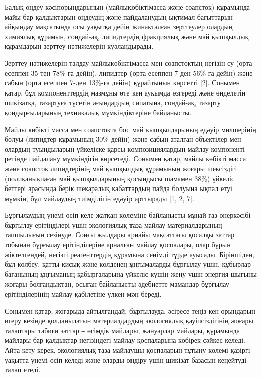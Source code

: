 \begin{multicols}{2}
Балық өңдеу кәсіпорындарының (майлыкөбіктімасса және соапсток) құрамында
майы бар қалдықтарын өңдеудің және пайдаланудың ықтимал бағыттарын
айқындау мақсатында осы уақытқа дейін жинақталған зерттеулер олардың
химиялық құрамын, сондай-ақ, липидтердің фракциялық және май қышқылдық
құрамдарын зерттеу нәтижелерін куәландырады.

Зерттеу нәтижелерін талдау майлыкөбіктімасса мен соапстоктың негізін су
(орта есеппен 35-тен 78\%-ға дейін), липидтер (орта есеппен 7-ден
56\%-ға дейін) және сабын (орта есеппен 7-ден 13\%-ға дейін) құрайтынын
көрсетті {[}2{]}. Сонымен қатар, бұл компоненттердің мазмұны өте кең
ауқымда өзгереді және өңделетін шикізатқа, тазартуға түсетін ағындардың
сипатына, сондай-ақ, тазарту қондырғыларының техникалық мүмкіндіктеріне
байланысты.

Майлы көбікті масса мен соапстокта бос май қышқылдарының едәуір
мөлшерінің болуы (липидтер құрамының 30\% дейін) және сабын аталған
объектілер мен олардың туындыларын үйкеліске қарсы композициялардың
майлау компоненті ретінде пайдалану мүмкіндігін көрсетеді. Сонымен
қатар, майлы көбікті масса және соапсток липидтерінің май қышқылдық
құрамының жоғары шексіздігі (полиқанықпаған май қышқылдарының қосындысы
шамамен 38\%) үйкеліс беттері арасында берік шекаралық қабаттардың пайда
болуына ықпал етуі мүмкін, бұл майлаудың тиімділігін едәуір арттырады
{[}1, 2, 7{]}.

Бұрғылаудың үнемі өсіп келе жатқан көлеміне байланысты мұнай-газ
өнеркәсібі бұрғылау ерітінділері үшін экологиялық таза майлау
материалдарының тапшылығын сезінуде. Соңғы жылдары арнайы мақсаттағы
қосалқы заттар тобынан бұрғылау ерітінділеріне арналған майлау
қоспалары, олар бұрын жіктелгендей, негізгі реагенттердің құрамына
сенімді түрде ауысады. Біріншіден, бұл көлбеу, қатты қисық және көлденең
ұңғымаларды бұрғылау үшін, құбырлар бағанының ұңғыманың қабырғаларына
үйкеліс күшін жеңу үшін энергия шығыны жоғары болғандықтан, осыған
байланысты әдебиетте мамандар бұрғылау ерітінділерінің майлау қабілетіне
үлкен мән береді.

Сонымен қатар, жоғарыда айтылғандай, бұрғылауда, әсіресе теңіз кен
орындарын игеру кезінде қолданылатын материалдардың экологиялық
қауіпсіздігінің жоғары талаптары табиғи заттар ‒ өсімдік майлары,
жануарлар майлары, құрамында майлары бар қалдықтар негізіндегі майлау
қоспаларына көбірек сәйкес келеді. Айта кету керек, экологиялық таза
майлаушы қоспаларын тұтыну көлемі қазіргі уақытта үнемі өсіп келеді және
оларды өндіру үшін шикізат базасын кеңейтуді талап етеді.


\end{multicols}
